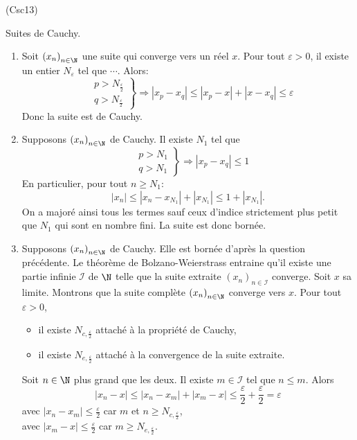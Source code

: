 \begin{tiny}(Csc13)\end{tiny} Suites de Cauchy.
\begin{enumerate}
 \item Soit $\left( x_n \right)_{n \in \N}$ une suite qui converge vers un réel $x$. Pour tout $\varepsilon >0$, il existe un entier $N_{\varepsilon}$ tel que $\cdots$. Alors:
\[
\left. 
\begin{aligned}
 &p > N_{\frac{\varepsilon}{2}} \\  &q > N_{\frac{\varepsilon}{2}} 
\end{aligned}
\right\rbrace \Rightarrow 
\left|x_p - x_q\right| \leq \left|x_p - x\right| + \left|x - x_q\right| \leq \varepsilon
\]
Donc la suite est de Cauchy.
 \item Supposons $\left( x_n \right)_{n \in \N}$ de Cauchy. Il existe $N_1$ tel que
\[
\left. 
\begin{aligned}
 &p > N_{1} \\  &q > N_{1} 
\end{aligned}
\right\rbrace \Rightarrow 
\left|x_p - x_q\right| \leq 1
\]
En particulier, pour tout $n\geq N_1$:
\[
 |x_n| \leq |x_n - x_{N_1}| + |x_{N_1}| \leq 1 + |x_{N_1}|. 
\]
On a majoré ainsi tous les termes sauf ceux d'indice strictement plus petit que $N_1$ qui sont en nombre fini. La suite est donc bornée.
 \item Supposons $\left( x_n \right)_{n \in \N}$ de Cauchy. Elle est bornée d'après la question précédente. Le théorème de Bolzano-Weierstrass entraine qu'il existe une partie infinie $\mathcal{I}$ de $\N$ telle que la suite extraite $\left( x_n \right)_{n \in \mathcal{I}}$ converge. Soit $x$ sa limite.\newline
 Montrons que la suite complète $\left( x_n \right)_{n \in \N}$  converge vers $x$. Pour tout $\varepsilon >0$,
 \begin{itemize}
  \item il existe $N_{c,\frac{\varepsilon}{2}}$ attaché à la propriété de Cauchy,
  \item il existe $N_{e,\frac{\varepsilon}{2}}$ attaché à la convergence de la suite extraite.
 \end{itemize}
Soit $n\in \N$ plus grand que les deux. Il existe $m\in \mathcal{I}$ tel que $n \leq m$. Alors
\[
 |x_n -x| \leq |x_n -x_m| + |x_m -x| \leq \frac{\varepsilon}{2} + \frac{\varepsilon}{2} = \varepsilon
\]
avec $|x_n -x_m|\leq \frac{\varepsilon}{2}$ car $m$ et $n \geq N_{c,\frac{\varepsilon}{2}}$, \\
avec $|x_m -x|\leq \frac{\varepsilon}{2}$ car $m \geq N_{e,\frac{\varepsilon}{2}}$.
\end{enumerate}
